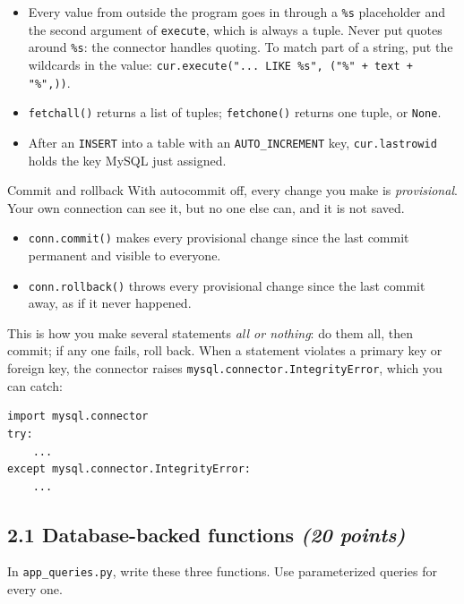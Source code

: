 \documentclass[11pt]{article}
\newcommand{\code}[1]{\texttt{#1}}
\newcommand{\pts}[1]{\hfill\textit{(#1 points)}}
\begin{document}
\begin{itemize}
  \item Every value from outside the program goes in through a \code{\%s}
  placeholder and the second argument of \code{execute}, which is always a
  tuple. Never put quotes around \code{\%s}: the connector handles quoting.
  To match part of a string, put the wildcards in the value:
  \lstinline|cur.execute("... LIKE %s", ("%" + text + "%",))|.
  \item \code{fetchall()} returns a list of tuples; \code{fetchone()} returns
  one tuple, or \code{None}.
  \item After an \code{INSERT} into a table with an \code{AUTO\_INCREMENT} key,
  \code{cur.lastrowid} holds the key MySQL just assigned.
\end{itemize}

\begin{notebox}{Commit and rollback}
With autocommit off, every change you make is \emph{provisional}. Your own
connection can see it, but no one else can, and it is not saved.
\begin{itemize}[nosep]
  \item \code{conn.commit()} makes every provisional change since the last
  commit permanent and visible to everyone.
  \item \code{conn.rollback()} throws every provisional change since the last
  commit away, as if it never happened.
\end{itemize}
This is how you make several statements \emph{all or nothing}: do them all,
then commit; if any one fails, roll back. When a statement violates a primary
key or foreign key, the connector raises \code{mysql.connector.IntegrityError},
which you can catch:
\begin{lstlisting}[style=py]
import mysql.connector
try:
    ...
except mysql.connector.IntegrityError:
    ...
\end{lstlisting}
\end{notebox}

\subsection*{2.1 Database-backed functions \pts{20}}

In \code{app\_queries.py}, write these three functions. Use parameterized
queries for every one.
\end{document}
